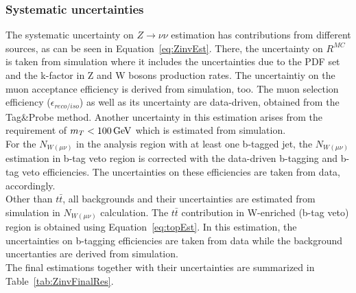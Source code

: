 \subsubsection{Systematic uncertainties}
\label{subsect:ZnnSyst}
The systematic uncertainty on $Z\to \nu\nu$ estimation has contributions from different sources, as can be seen in Equation~\ref{eq:ZinvEst}. There, the uncertainty on $R^{MC}$ is taken from simulation where it includes the uncertainties due to the PDF set and the k-factor in Z and W bosons production rates. The uncertaintiy on the muon acceptance efficiency is derived from simulation, too. The muon selection efficiency ($\epsilon_{reco/iso}$) as well as its uncertainty are data-driven, obtained from the Tag\&Probe method. Another uncertainty in this estimation arises from the requirement of $m_T<100\,\rm GeV$ which is estimated from simulation.\\
For the $N_{W(\mu\nu)}$ in the analysis region with at least one b-tagged jet, the $N_{W(\mu\nu)}$ estimation in b-tag veto region is corrected with  the data-driven b-tagging and b-tag veto efficiencies. The uncertainties on these efficiencies are taken from data, accordingly.\\
Other than $t\bar{t}$, all backgrounds and their uncertainties are estimated from simulation in $N_{W(\mu\nu)}$ calculation. The $t\bar{t}$ contribution in W-enriched (b-tag veto) region is obtained using Equation~\ref{eq:topEst}. In this estimation, the uncertainties on b-tagging efficiencies are taken from data while the background uncertanties are derived from simulation. \\ 

The final estimations together with their uncertainties are summarized in Table~\ref{tab:ZinvFinalRes}.

